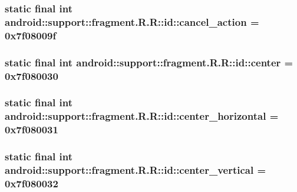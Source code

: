 \hypertarget{classandroid_1_1support_1_1fragment_1_1_r_1_1id_1286922dc4f2988e821f3dc9af352d92}{
\subsubsection[{cancel\_\-action}]{\setlength{\rightskip}{0pt plus 5cm}static final int android::support::fragment.R.R::id::cancel\_\-action = 0x7f08009f}}
\label{classandroid_1_1support_1_1fragment_1_1_r_1_1id_1286922dc4f2988e821f3dc9af352d92}


\hypertarget{classandroid_1_1support_1_1fragment_1_1_r_1_1id_9af1326c84cdb0396504a7635ccadec0}{
\subsubsection[{center}]{\setlength{\rightskip}{0pt plus 5cm}static final int android::support::fragment.R.R::id::center = 0x7f080030}}
\label{classandroid_1_1support_1_1fragment_1_1_r_1_1id_9af1326c84cdb0396504a7635ccadec0}


\hypertarget{classandroid_1_1support_1_1fragment_1_1_r_1_1id_8f0f2a7c0e60b471feee379d5276703f}{
\subsubsection[{center\_\-horizontal}]{\setlength{\rightskip}{0pt plus 5cm}static final int android::support::fragment.R.R::id::center\_\-horizontal = 0x7f080031}}
\label{classandroid_1_1support_1_1fragment_1_1_r_1_1id_8f0f2a7c0e60b471feee379d5276703f}


\hypertarget{classandroid_1_1support_1_1fragment_1_1_r_1_1id_cf15bed388e9af7656afbc0e03860c0a}{
\subsubsection[{center\_\-vertical}]{\setlength{\rightskip}{0pt plus 5cm}static final int android::support::fragment.R.R::id::center\_\-vertical = 0x7f080032}}
\label{classandroid_1_1support_1_1fragment_1_1_r_1_1id_cf15bed388e9af7656afbc0e03860c0a}


